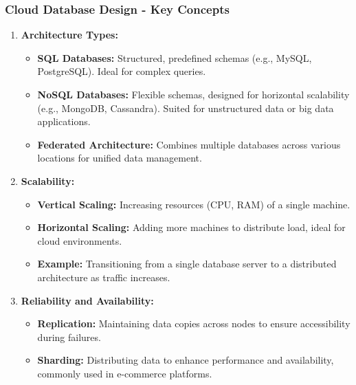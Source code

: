 \documentclass[aspectratio=169]{beamer}
\begin{document}
\begin{frame}[fragile]
    \frametitle{Cloud Database Design - Key Concepts}
    \begin{enumerate}
        \item \textbf{Architecture Types:}
            \begin{itemize}
                \item \textbf{SQL Databases:} Structured, predefined schemas (e.g., MySQL, PostgreSQL). Ideal for complex queries.
                \item \textbf{NoSQL Databases:} Flexible schemas, designed for horizontal scalability (e.g., MongoDB, Cassandra). Suited for unstructured data or big data applications.
                \item \textbf{Federated Architecture:} Combines multiple databases across various locations for unified data management.
            \end{itemize}
        
        \item \textbf{Scalability:}
            \begin{itemize}
                \item \textbf{Vertical Scaling:} Increasing resources (CPU, RAM) of a single machine.
                \item \textbf{Horizontal Scaling:} Adding more machines to distribute load, ideal for cloud environments.
                \item \textbf{Example:} Transitioning from a single database server to a distributed architecture as traffic increases.
            \end{itemize}

        \item \textbf{Reliability and Availability:}
            \begin{itemize}
                \item \textbf{Replication:} Maintaining data copies across nodes to ensure accessibility during failures.
                \item \textbf{Sharding:} Distributing data to enhance performance and availability, commonly used in e-commerce platforms.
            \end{itemize}
    \end{enumerate}
\end{frame}
\end{document}
